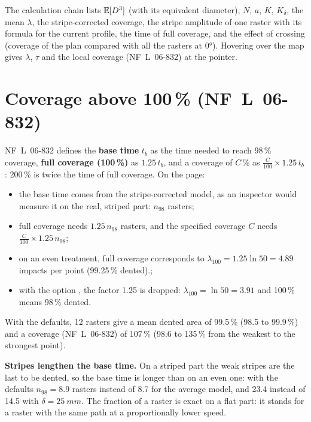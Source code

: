 \documentclass[11pt,a4paper]{article}
\begin{document}
\noindent The calculation chain lists $\mathbb{E}[D^3]$ (with its equivalent diameter), $\dot N$, $a$, $K$, $K_\delta$, the mean $\lambda$, the stripe-corrected coverage, the stripe amplitude of one raster with its formula for the current profile, the time of full coverage, and the effect of crossing (coverage of the plan compared with all the rasters at 0°). Hovering over the map gives $\lambda$, $\tau$ and the local coverage (NF~L~06-832) at the pointer.

\section{Coverage above 100\,\% (NF~L~06-832)}\label{sec:above}

NF~L~06-832 defines the \textbf{base time} $t_b$ as the time needed to reach 98\,\% coverage, \textbf{full coverage (100\,\%)} as $1.25\,t_b$, and a coverage of $C$\,\% as $\frac{C}{100}\times1.25\,t_b$: 200\,\% is twice the time of full coverage. On the page:
\begin{itemize}[leftmargin=*]
\item the base time comes from the stripe-corrected model, as an inspector would measure it on the real, striped part: $n_{98}$ rasters;
\item full coverage needs $1.25\,n_{98}$ rasters, and the specified coverage $C$ needs $\frac{C}{100}\times1.25\,n_{98}$;
\item on an even treatment, full coverage corresponds to $\lambda_{100}=1.25\ln50=4.89$ impacts per point (99.25\,\% dented).;
\item with the option , the factor 1.25 is dropped: $\lambda_{100}=\ln 50=3.91$ and 100\,\% means 98\,\% dented.
\end{itemize}


\noindent With the defaults, 12 rasters give a mean dented area of 99.5\,\% (98.5 to 99.9\,\%) and a coverage (NF~L~06-832) of 107\,\% (98.6 to 135\,\% from the weakest to the strongest point).

\textbf{Stripes lengthen the base time.} On a striped part the weak stripes are the last to be dented, so the base time is longer than on an even one: with the defaults $n_{98}=8.9$ rasters instead of 8.7 for the average model, and 23.4 instead of 14.5 with $\delta=\SI{25}{mm}$. The fraction of a raster is exact on a flat part: it stands for a raster with the same path at a proportionally lower speed.


\end{document}
